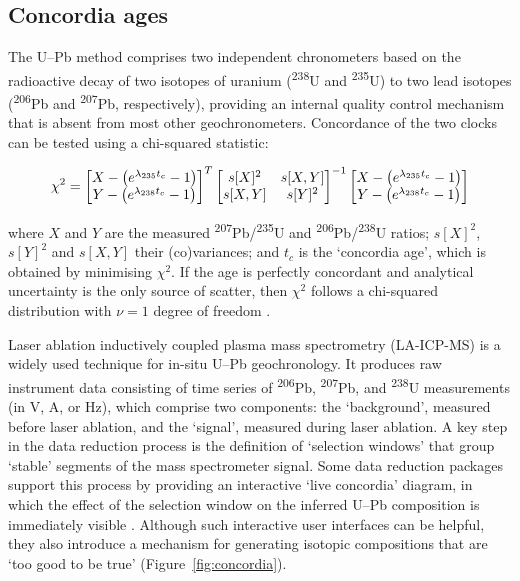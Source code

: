 \documentclass{article}
\begin{document}
\subsection{Concordia ages}\label{sec:concordia}

The U--Pb method comprises two independent chronometers based on the
radioactive decay of two isotopes of uranium (\textsuperscript{238}U
and \textsuperscript{235}U) to two lead isotopes
(\textsuperscript{206}Pb and \textsuperscript{207}Pb, respectively),
providing an internal quality control mechanism that is absent from
most other geochronometers. Concordance of the two clocks can be
tested using a chi-squared statistic:

\begin{equation}
  \chi^2 =
  \left[
    \begin{array}{@{}c@{}}
      X - \left(e^{\lambda_{235}t_c} - 1\right) \\
      Y - \left(e^{\lambda_{238}t_c} - 1\right)
    \end{array}
    \right]^T
  \left[
    \begin{array}{@{}cc@{}}
      s[X]^2 & s[X,Y] \\
      s[X,Y] & s[Y]^2
    \end{array}
    \right]^{-1}
  \left[
    \begin{array}{@{}c@{}}
      X - \left(e^{\lambda_{235}t_c} - 1\right) \\
      Y - \left(e^{\lambda_{238}t_c} - 1\right)
    \end{array}
    \right]
  \label{eq:concordance}
\end{equation}

\noindent where $X$ and $Y$ are the measured
\textsuperscript{207}Pb/\textsuperscript{235}U and
\textsuperscript{206}Pb/\textsuperscript{238}U ratios; $s[X]^2$,
$s[Y]^2$ and $s[X,Y]$ their (co)variances; and $t_c$ is the `concordia
age', which is obtained by minimising $\chi^2$. If the age is
perfectly concordant and analytical uncertainty is the only source of
scatter, then $\chi^2$ follows a chi-squared distribution with $\nu =
1$ degree of freedom \citep{ludwig1998}.\medskip

Laser ablation inductively coupled plasma mass spectrometry
(LA-ICP-MS) is a widely used technique for in-situ U--Pb
geochronology. It produces raw instrument data consisting of time
series of \textsuperscript{206}Pb, \textsuperscript{207}Pb, and
\textsuperscript{238}U measurements (in V, A, or Hz), which comprise
two components: the `background', measured before laser ablation, and
the `signal', measured during laser ablation. A key step in the data
reduction process is the definition of `selection windows' that group
`stable' segments of the mass spectrometer signal. Some data reduction
packages support this process by providing an interactive `live
concordia' diagram, in which the effect of the selection window on the
inferred U--Pb composition is immediately visible
\citep[e.g.,][]{petrus2012}. Although such interactive user interfaces
can be helpful, they also introduce a mechanism for generating
isotopic compositions that are `too good to be true'
(Figure~\ref{fig:concordia}).\medskip
\end{document}
